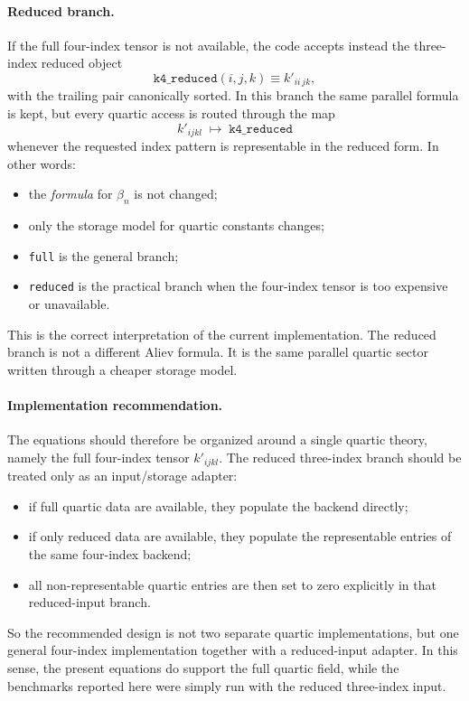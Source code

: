 \documentclass[11pt]{article}
\begin{document}
\paragraph{Reduced branch.}
If the full four-index tensor is not available, the code accepts instead the
three-index reduced object
\[
\texttt{k4\_reduced}(i,j,k)\equiv k'_{ii\,jk},
\]
with the trailing pair canonically sorted. In this branch the same parallel
formula is kept, but every quartic access is routed through the map
\[
k'_{ijkl}\;\longmapsto\;\texttt{k4\_reduced}
\]
whenever the requested index pattern is representable in the reduced form. In
other words:
\begin{itemize}
\item the \emph{formula} for $\beta_n$ is not changed;
\item only the storage model for quartic constants changes;
\item \texttt{full} is the general branch;
\item \texttt{reduced} is the practical branch when the four-index tensor is
too expensive or unavailable.
\end{itemize}

This is the correct interpretation of the current implementation. The reduced
branch is not a different Aliev formula. It is the same parallel quartic sector
written through a cheaper storage model.

\paragraph{Implementation recommendation.}
The equations should therefore be organized around a single quartic theory,
namely the full four-index tensor $k'_{ijkl}$. The reduced three-index branch
should be treated only as an input/storage adapter:
\begin{itemize}
\item if full quartic data are available, they populate the backend directly;
\item if only reduced data are available, they populate the representable
entries of the same four-index backend;
\item all non-representable quartic entries are then set to zero explicitly in
that reduced-input branch.
\end{itemize}
So the recommended design is not two separate quartic implementations, but one
general four-index implementation together with a reduced-input adapter. In
this sense, the present equations do support the full quartic field, while the
benchmarks reported here were simply run with the reduced three-index input.
\end{document}
